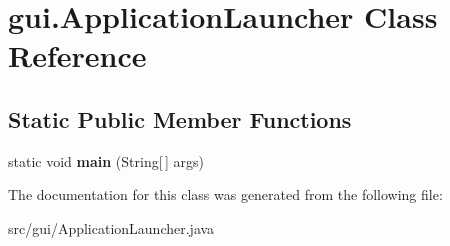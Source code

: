 \hypertarget{classgui_1_1_application_launcher}{}\section{gui.\+Application\+Launcher Class Reference}
\label{classgui_1_1_application_launcher}
\subsection*{Static Public Member Functions}
\begin{DoxyCompactItemize}
\item 
\mbox{\label{classgui_1_1_application_launcher_a4d18ca6d7262e81ed5e5746dae2de30a}} 
static void {\bfseries main} (String\mbox{[}$\,$\mbox{]} args)
\end{DoxyCompactItemize}


The documentation for this class was generated from the following file\+:\begin{DoxyCompactItemize}
\item 
src/gui/Application\+Launcher.\+java\end{DoxyCompactItemize}
